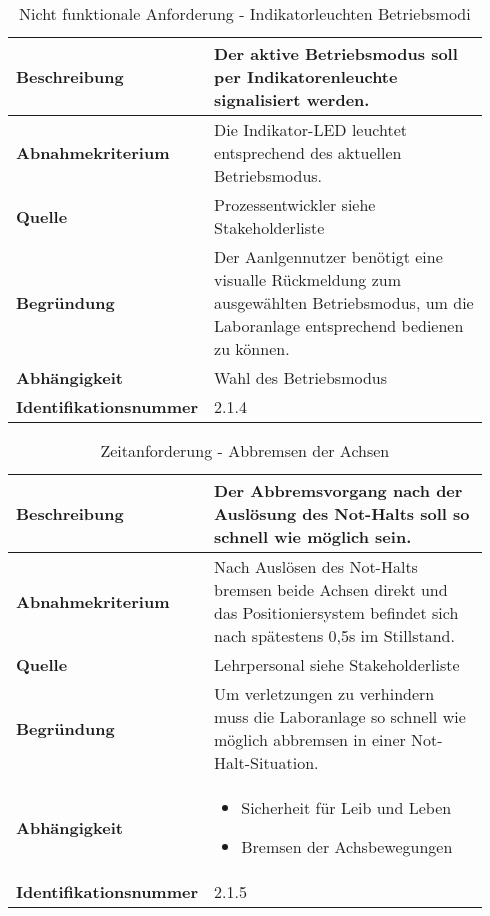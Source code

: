 \documentclass[../Bachelorarbeit.tex]{subfiles}
\begin{document}
\begin{table}[H]
    \centering
    \begin{tabular}{| p{0.34\linewidth} | p{0.6\linewidth} |}
        \hline
        \textbf{Beschreibung} & Der aktive Betriebsmodus soll per Indikatorenleuchte signalisiert werden. \\ \hline
        \textbf{Abnahmekriterium} & Die Indikator-LED leuchtet entsprechend des aktuellen Betriebsmodus. \\ \hline
        \textbf{Quelle} & Prozessentwickler siehe Stakeholderliste \\ \hline
        \textbf{Begründung} & Der Aanlgennutzer benötigt eine visualle Rückmeldung zum ausgewählten Betriebsmodus, um die Laboranlage entsprechend bedienen zu können. \\ \hline
        \textbf{Abhängigkeit} & Wahl des Betriebsmodus \\ \hline
        \textbf{Identifikationsnummer} & 2.1.4 \\ \hline
    \end{tabular}
    \caption[\acs{nfa} - Indikatorleuchten Betriebsmodi]{Nicht funktionale Anforderung - Indikatorleuchten Betriebsmodi}
    \label{tab:my-table14}
\end{table}

\begin{table}[H]
    \centering
    \begin{tabular}{| p{0.34\linewidth} | p{0.6\linewidth} |}
        \hline
        \textbf{Beschreibung} & Der Abbremsvorgang nach der Auslösung des Not-Halts soll so schnell wie möglich sein. \\ \hline
        \textbf{Abnahmekriterium} & Nach Auslösen des Not-Halts bremsen beide Achsen direkt und das Positioniersystem befindet sich nach spätestens 0,5s im Stillstand. \\ \hline
        \textbf{Quelle} & Lehrpersonal siehe Stakeholderliste \\ \hline
        \textbf{Begründung} & Um verletzungen zu verhindern muss die Laboranlage so schnell wie möglich abbremsen in einer Not-Halt-Situation. \\ \hline
        \textbf{Abhängigkeit} & {\begin{itemize}[noitemsep,topsep=0pt,parsep=0pt,partopsep=0pt,leftmargin=*]
                                    \item Sicherheit für Leib und Leben
                                    \item Bremsen der Achsbewegungen
                                \end{itemize}} \\ \hline
        \textbf{Identifikationsnummer} & 2.1.5 \\ \hline
    \end{tabular}
    \caption[\acs{nfa} - Abbremsen der Achsen]{Zeitanforderung - Abbremsen der Achsen}
    \label{tab:my-table15}
\end{table}
\end{document}
